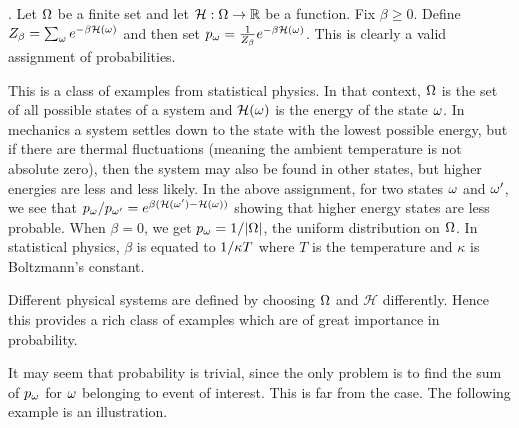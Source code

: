 \documentclass[preprint,  11pt]{amsart}
\def\HH{\mathcal H}
\begin{document}
\begin{example}. Let $\Omega$ be a finite set and let $\HH:\Ome\to \R$ be a function. Fix $\beta\ge 0$. Define $Z_{\beta}=\sum_{\ome}e^{-\beta \HH(\ome)}$ and then set $p_{\ome}=\frac{1}{Z_{\beta}}e^{-\beta \HH(\ome)}$. This is clearly a valid assignment of probabilities.

This is a class of examples from statistical physics. In that context, $\Omega$ is the set of all possible states of a system and $\HH(\ome)$ is the energy of the state $\omega$. In mechanics a system settles down to the state with the lowest possible energy, but if there are thermal fluctuations (meaning the ambient temperature is not absolute zero), then the system may also be found in other states, but higher energies are less and less likely. In the above assignment, for two states $\omega$ and $\omega'$, we see that $p_{\ome}/p_{\ome'}=e^{\beta (\HH(\ome')-\HH(\ome))}$ showing that higher energy states are less probable. When $\beta=0$, we get $p_{\omega}=1/|\Omega|$, the uniform distribution on $\Omega$. In statistical physics, $\beta$ is equated to $1/\kappa T$ where $T$ is the temperature and $\kappa$ is Boltzmann's constant.

Different physical systems are defined by choosing $\Omega$ and $\HH$ differently. Hence this provides a rich class of examples which are of great importance in probability.
\end{example}

It may seem that probability is trivial, since the only problem is to find the sum of $p_{\omega}$ for $\omega$ belonging to event of interest. This is far from the case. The following example is an illustration.
\end{document}
